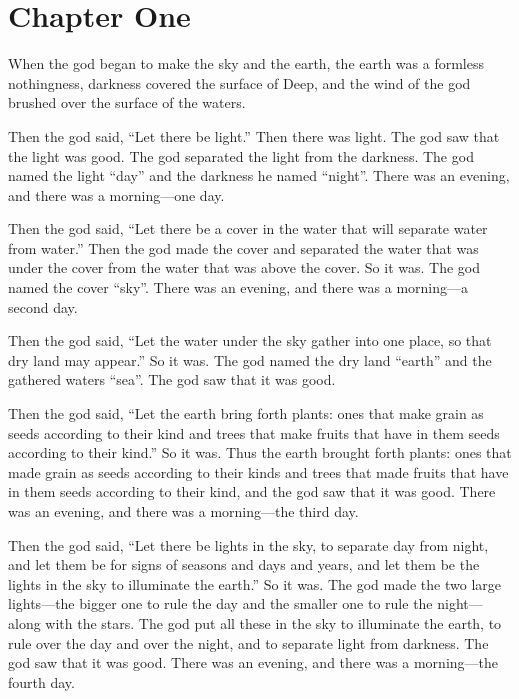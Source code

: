 \chapter*{Chapter One}

When the god began to make the sky and the earth, 
the earth was a formless nothingness, 
darkness covered the surface of Deep,
and the wind of the god brushed over the surface of the waters. 

Then the god said, 
\enquote{Let there be light.} 
Then there was light. 
The god saw that the light was good. 
The god separated the light from the darkness. 
The god named the light \enquote{day} and the darkness he named \enquote{night}. 
There was an evening, and there was a morning---one day.

Then the god said, 
\enquote{Let there be a cover in the water that will separate water from water.} 
Then the god made the cover and separated the water that was under the cover from the water that was above the cover. 
So it was. 
The god named the cover \enquote{sky}. 
There was an evening, and there was a morning---a second day.

Then the god said, 
\enquote{Let the water under the sky gather into one place, so that dry land may appear.} 
So it was. 
The god named the dry land \enquote{earth} and the gathered waters \enquote{sea}. 
The god saw that it was good. 

Then the god said, 
\enquote{Let the earth bring forth plants: 
ones that make grain as seeds according to their kind and 
trees that make fruits that have in them seeds according to their kind.} 
So it was. 
Thus the earth brought forth plants: 
ones that made grain as seeds according to their kinds and 
trees that made fruits that have in them seeds according to their kind, 
and the god saw that it was good. 
There was an evening, and there was a morning---the third day.

Then the god said, 
\enquote{Let there be lights in the sky, 
to separate day from night, and 
let them be for signs of seasons and days and years, 
and let them be the lights in the sky to illuminate the earth.} 
So it was. 
The god made the two large lights---the bigger one to rule the day 
and the smaller one to rule the night---along with the stars. 
The god put all these in the sky to illuminate the earth, 
to rule over the day and over the night, 
and to separate light from darkness. The god saw that it was good.
There was an evening, and there was a morning---the fourth day.

